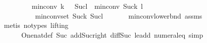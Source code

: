 \begin{isabellebody}
\ \ \ \ \ \ \ \ {\isasymle}\ min{\isacharunderscore}{\kern0pt}conv\ {\isacharparenleft}{\kern0pt}k\ {\isacharplus}{\kern0pt}\ {}{\isacharparenright}{\kern0pt}\ {\isacharparenleft}{\kern0pt}Suc{\isacharparenleft}{\kern0pt}l{\isacharplus}{\kern0pt}{}{\isacharparenright}{\kern0pt}{\isacharparenright}{\kern0pt}\ {\isacharplus}{\kern0pt}\ min{\isacharunderscore}{\kern0pt}conv\ {\isacharparenleft}{\kern0pt}Suc{\isacharparenleft}{\kern0pt}k{\isacharplus}{\kern0pt}{}{\isacharparenright}{\kern0pt}{\isacharparenright}{\kern0pt}\ {\isacharparenleft}{\kern0pt}l\ {\isacharplus}{\kern0pt}\ {}{\isacharparenright}{\kern0pt}\ {\isacharminus}{\kern0pt}\ {}{\isachardoublequoteclose}\isanewline
\ \ \ \ \ \ \ \ \ \ {\isachardoublequoteopen}min{\isacharunderscore}{\kern0pt}conv{\isacharunderscore}{\kern0pt}set\ {\isacharparenleft}{\kern0pt}Suc{\isacharparenleft}{\kern0pt}k{\isacharplus}{\kern0pt}{}{\isacharparenright}{\kern0pt}{\isacharparenright}{\kern0pt}\ {\isacharparenleft}{\kern0pt}Suc{\isacharparenleft}{\kern0pt}l{\isacharplus}{\kern0pt}{}{\isacharparenright}{\kern0pt}{\isacharparenright}{\kern0pt}\ {\isasymnoteq}\ {\isacharbraceleft}{\kern0pt}{\isacharbraceright}{\kern0pt}{\isachardoublequoteclose}\ \isanewline
%
\isadelimproof
\ \ %
\endisadelimproof
%
\isatagproof
{}\isamarkupfalse%
\ min{\isacharunderscore}{\kern0pt}conv{\isacharunderscore}{\kern0pt}lower{\isacharunderscore}{\kern0pt}bnd{\isacharparenleft}{\kern0pt}{}{\isacharcomma}{\kern0pt}{}{\isacharparenright}{\kern0pt}\ assms{\isacharparenleft}{\kern0pt}{}{\isacharcomma}{\kern0pt}{}{\isacharparenright}{\kern0pt}\isanewline
\ \ \isamarkupfalse%
\ {\isacharparenleft}{\kern0pt}metis\ {\isacharparenleft}{\kern0pt}no{\isacharunderscore}{\kern0pt}types{\isacharcomma}{\kern0pt}\ lifting{\isacharparenright}{\kern0pt}\ \isanewline
\ \ \ \ \ \ One{\isacharunderscore}{\kern0pt}nat{\isacharunderscore}{\kern0pt}def\ Suc{\isacharunderscore}{\kern0pt}{}\ add{\isacharunderscore}{\kern0pt}Suc{\isacharunderscore}{\kern0pt}right\ diff{\isacharunderscore}{\kern0pt}Suc{\isacharunderscore}{\kern0pt}{}\ le{\isacharunderscore}{\kern0pt}add{}\ numeral{\isacharunderscore}{\kern0pt}{}{\isacharunderscore}{\kern0pt}eq{\isacharunderscore}{\kern0pt}{}{\isacharcomma}{\kern0pt}\ simp{\isacharparenright}{\kern0pt}%
\endisatagproof
{\isafoldproof}%
%
\isadelimproof
\isanewline
%
\endisadelimproof
\isanewline
\isanewline

\end{isabellebody}
